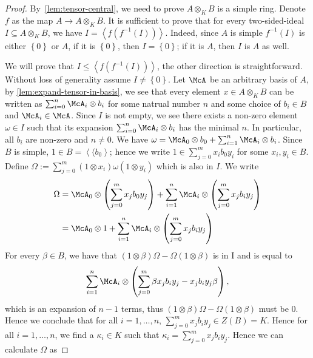 \begin{proof}
  By~\cref{lem:tensor-central}, we need to prove $A\otimes_{K}B$ is a simple
  ring. Denote $f$ as the map $A\to A\otimes_{K}B$. It is sufficient to prove
  that for every two-sided-ideal $I\subseteq A\otimes_{K}B$, we have
  $I = \left\langle f\left(f^{-1}\left(I\right)\right)\right\rangle$. Indeed,
  since $A$ is simple $f^{-1}\left(I\right)$ is either $\left\{0\right\}$ or
  $A$, if it is $\left\{0\right\}$, then $I=\left\{0\right\}$; if it is $A$,
  then $I$ is $A$ as well.

  We will prove that
  $I \le \left\langle f\left(f^{-1}\left(I\right)\right)\right\rangle$, the
  other direction is straightforward. Without loss of generality assume
  $I\ne\left\{0\right\}$. Let $\McA$ be an arbitrary basis of $A$, by
  \cref{lem:expand-tensor-in-basis}, we see that every element
  $x \in A\otimes_{K}B$ can be written as $\sum_{i=0}^{n}\McA_{i}\otimes b_{i}$
  for some natrual number $n$ and some choice of $b_{i}\in B$ and
  $\McA_{i}\in \McA$. Since $I$ is not empty, we see there exists a non-zero
  element $\omega\in I$ such that its expansion
  $\sum_{i=0}^{n}\McA_{i}\otimes b_{i}$ has the minimal $n$. In particular, all
  $b_{i}$ are non-zero and $n\ne0$. We have
  $\omega=\McA_{0}\otimes b_{0}+\sum_{i=1}^{n}\McA_{i}\otimes b_{i}$. Since $B$
  is simple, $1 \in B = \left\langle\langle b_{0} \right\rangle$; hence we write
  $1\in\sum_{j=0}^{m}x_{i}b_{0}y_{i}$ for some $x_{i},y_{i}\in B$. Define
  $\Omega := \sum_{j=0}^{m}(1\otimes x_{i})\omega(1\otimes y_{i})$ which is also
  in $I$. We write
  \[
    \begin{aligned}
      \Omega &= \McA_{0} \otimes \left(\sum_{j=0}^{m}x_{j}b_{0}y_{j}\right) + \sum_{i=1}^{n}\McA_{i}\otimes\left(\sum_{j=0}^{m}x_{j}b_{i}y_{j}\right) \\
             &= \McA_{0}\otimes 1 + \sum_{i=1}^{n}\McA_{i}\otimes\left(\sum_{j=0}^{m}x_{j}b_{i}y_{j}\right)
    \end{aligned}
  \]
  For every $\beta\in B$, we have that
  $\left(1\otimes \beta\right)\Omega - \Omega\left(1\otimes \beta\right)$ is in
  I and is equal to
  \[
    \sum_{i=1}^{n}\McA_{i}\otimes\left(\sum_{j=0}^{m}\beta x_{j}b_{i}y_{j}-x_{j}b_{i}y_{j}\beta\right),
  \]
  which is an expansion of $n-1$ terms, thus
  $\left(1\otimes\beta\right)\Omega-\Omega\left(1\otimes\beta\right)$ must be
  $0$. Hence we conclude that for all $i=1,\dots,n$,
  $\sum_{j=0}^{m}x_{j}b_{i}y_{j}\in Z\left(B\right)=K$. Hence for all
  $i=1,\dots,n$, we find a $\kappa_{i}\in K$ such that
  $\kappa_{i}=\sum_{j=0}^{m}x_{j}b_{i}y_{j}$. Hence we can calculate $\Omega$ as

\end{proof}
